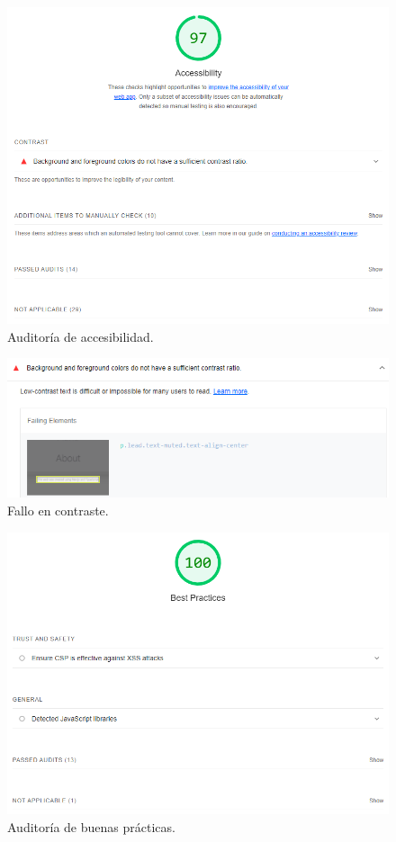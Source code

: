 \documentclass[12pt,twoside,titlepage]{report}
\begin{document}
\begin{figure}[H]
    \centering
    \includegraphics[scale=0.6]{Lighthouse/Accesibility}
    \caption{Auditoría de accesibilidad.}
    \label{fig:Lighthouse_accesibility}
\end{figure}

\begin{figure}[H]
    \centering
    \includegraphics[scale=0.6]{Lighthouse/AccesibilityContrast}
    \caption{Fallo en contraste.}
    \label{fig:Lighthouse_contrast}
\end{figure}

\begin{figure}[H]
    \centering
    \includegraphics[scale=0.6]{Lighthouse/BestPractices}
    \caption{Auditoría de buenas prácticas.}
    \label{fig:Lighthouse_bestpractices}
\end{figure}
\end{document}
